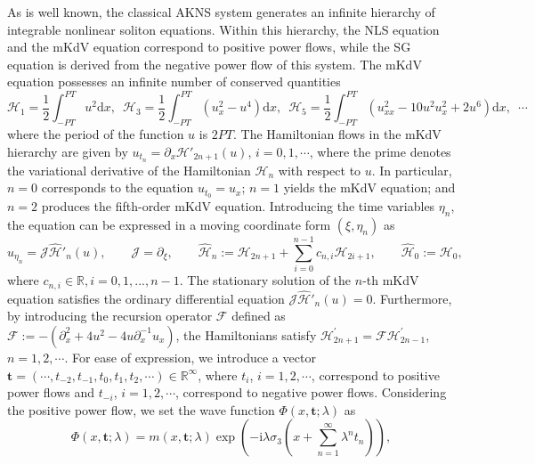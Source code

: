 \documentclass[11pt,reqno]{amsart}
\newcommand{\ii}{\mathrm{i}}
\newcommand{\dd}{\mathrm{d}}
\numberwithin{equation}{section}
\begin{document}
As is well known, the classical AKNS system \cite{AblowitzKNS-1974-inverse} generates an infinite hierarchy of integrable nonlinear soliton equations.
Within this hierarchy, the NLS equation and the mKdV equation correspond to positive power flows, while the SG equation is derived from the negative power flow of this system. 
The mKdV equation possesses an infinite number of conserved quantities
	\begin{equation}\label{eq:H0}
		\!\!\!
		\mathcal{H}_1=\frac{1}{2}\int_{-PT}^{PT} u^2 \dd  x  , \,\,\,
		\mathcal{H}_3=\frac{1}{2}\int_{-PT}^{PT}\left(u_x^2-u^4\right) \dd  x ,  \,\,\,
		\mathcal{H}_5= \frac{1}{2}\int_{-PT}^{PT} \left( u_{xx}^2-10u^2u_{x}^2+2u^6 \right)\dd x,  \,\,\, \cdots
		\!\!\!
	\end{equation} 
where the period of the function $u$ is $2PT$. 
The Hamiltonian flows in the mKdV hierarchy are given by $u_{t_n}=\partial_x\mathcal{H}'_{2n+1}(u)$, $i=0,1,\cdots$, where the prime denotes the variational derivative of the Hamiltonian $\mathcal{H}_n$ with respect to $u$. 
In particular, $n=0$ corresponds to the equation $u_{t_0}=u_x$;  $n=1$ yields the mKdV equation; and $n=2$ produces the fifth-order mKdV equation.
Introducing the time variables $\eta_n$, the equation can be expressed in a moving coordinate form $(\xi,\eta_n)$ as
\begin{equation}\label{eq:H-mKdV}
	u_{\eta_n}=\mathcal{J}\hat{\mathcal{H}}'_n(u),\qquad \mathcal{J}=\partial_{\xi}, \qquad
	\hat{\mathcal{H}}_n:=\mathcal{H}_{2n+1}+\sum_{i=0}^{n-1}c_{n,i}\mathcal{H}_{2i+1}, \qquad \hat{\mathcal{H}}_0:=\mathcal{H}_0,
\end{equation}
where $c_{n,i}\in \mathbb{R},i=0,1,...,n-1$. 
The stationary solution of the $n$-th mKdV equation satisfies the ordinary differential equation $\mathcal{J}\hat{\mathcal{H}}'_n(u)=0$. 
Furthermore, by introducing the recursion operator $\mathcal{F}$ defined as 
$\mathcal{F}:=-(\partial_x^2+4u^2 - 4u \partial_x^{-1} u_x)$, the Hamiltonians satisfy $\mathcal{H}^{\prime}_{2n+1}=\mathcal{FH}_{2n-1}^{\prime}$, $n=1,2,\cdots$.
For ease of expression, we introduce a vector $\mathbf{t}=\left(\cdots,t_{-2}, t_{-1},t_0, t_1, t_2 ,\cdots\right)\in \mathbb{R}^{\infty}$, where $t_i$, $i=1,2,\cdots$, correspond to positive power flows and $t_{-i}$, $i=1,2,\cdots$, correspond to negative power flows. 
Considering the positive power flow, we set the wave function $\Phi(x,\mathbf{t};\lambda)$ as 
\begin{equation}\label{eq:Phi-m}
	\Phi(x,\mathbf{t};\lambda)=m(x,\mathbf{t};\lambda)\exp\left(-\ii\lambda \sigma_3 \left(x+\sum_{n=1}^{\infty}\lambda^n t_n\right) \right),
\end{equation}
\end{document}
